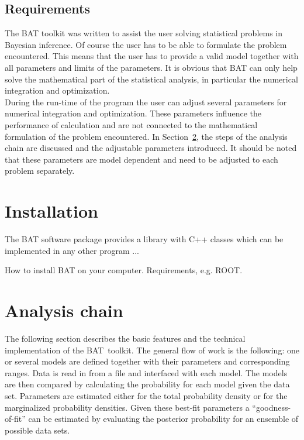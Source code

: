 \documentclass[11pt, a4paper]{article}
\newcommand{\BAT}{{\sc BAT}}
\begin{document}

\subsection{Requirements} 

The BAT toolkit was written to assist the user solving statistical
problems in Bayesian inference. Of course the user has to be able to
formulate the problem encountered. This means that the user has to
provide a valid model together with all parameters and limits of the
parameters. It is obvious that BAT can only help solve the
mathematical part of the statistical analysis, in particular the
numerical integration and optimization.  \\

\noindent 
During the run-time of the program the user can adjust several
parameters for numerical integration and optimization. These
parameters influence the performance of calculation and are not
connected to the mathematical formulation of the problem
encountered. In Section~\ref{section:analysis}, the steps of the
analysis chain are discussed and the adjustable parameters
introduced. It should be noted that these parameters are model
dependent and need to be adjusted to each problem separately. 


\section{Installation} 

The BAT software package provides a library with C++ classes which can
be implemented in any other program ...

How to install BAT on your computer. Requirements, e.g. ROOT.


\section{Analysis chain}
\label{section:analysis}

The following section describes the basic features and the technical
implementation of the \BAT\ toolkit. The general flow of work is the
following: one or several models are defined together with their
parameters and corresponding ranges. Data is read in from a file and
interfaced with each model. The models are then compared by
calculating the probability for each model given the data
set. Parameters are estimated either for the total probability density
or for the marginalized probability densities. Given these best-fit
parameters a ``goodness-of-fit'' can be estimated by evaluating the
posterior probability for an ensemble of possible data sets. 
\end{document}
